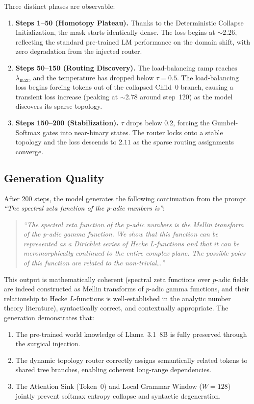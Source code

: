 \documentclass[11pt,a4paper]{article}
\begin{document}
Three distinct phases are observable:

\begin{enumerate}
    \item \textbf{Steps 1--50 (Homotopy Plateau).} Thanks to the Deterministic Collapse Initialization, the mask starts identically dense. The loss begins at $\sim$2.26, reflecting the standard pre-trained LM performance on the domain shift, with zero degradation from the injected router.
    \item \textbf{Steps 50--150 (Routing Discovery).} The load-balancing ramp reaches $\lambda_{\max}$, and the temperature has dropped below $\tau = 0.5$. The load-balancing loss begins forcing tokens out of the collapsed Child~0 branch, causing a transient loss increase (peaking at $\sim$2.78 around step~120) as the model discovers its sparse topology.
    \item \textbf{Steps 150--200 (Stabilization).} $\tau$ drops below $0.2$, forcing the Gumbel-Softmax gates into near-binary states. The router locks onto a stable topology and the loss descends to $2.11$ as the sparse routing assignments converge.
\end{enumerate}

\subsection{Generation Quality}

After 200 steps, the model generates the following continuation from the prompt \emph{``The spectral zeta function of the p-adic numbers is''}:

\begin{quote}
\emph{``The spectral zeta function of the p-adic numbers is the Mellin transform of the p-adic gamma function. We show that this function can be represented as a Dirichlet series of Hecke L-functions and that it can be meromorphically continued to the entire complex plane. The possible poles of this function are related to the non-trivial\ldots''}
\end{quote}

This output is mathematically coherent (spectral zeta functions over $p$-adic fields are indeed constructed as Mellin transforms of $p$-adic gamma functions, and their relationship to Hecke $L$-functions is well-established in the analytic number theory literature), syntactically correct, and contextually appropriate. The generation demonstrates that:

\begin{enumerate}
    \item The pre-trained world knowledge of Llama~3.1~8B is fully preserved through the surgical injection.
    \item The dynamic topology router correctly assigns semantically related tokens to shared tree branches, enabling coherent long-range dependencies.
    \item The Attention Sink (Token~0) and Local Grammar Window ($W = 128$) jointly prevent softmax entropy collapse and syntactic degeneration.
\end{enumerate}
\end{document}
